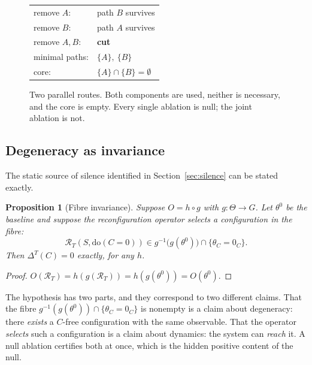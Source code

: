 \documentclass[11pt]{article}
\newtheorem{proposition}[theorem]{Proposition}
\theoremstyle{definition}
\theoremstyle{remark}
\newcommand{\Rop}{\mathcal{R}}
\newcommand{\dox}[1]{\mathrm{do}(#1)}
\begin{document}
\begin{figure}[ht]
\centering
\begin{minipage}{0.44\textwidth}
\centering
{}
\end{minipage}\hfill
\begin{minipage}{0.52\textwidth}
\small
\begin{tabular}{ll}
remove $A$: & path $B$ survives\\
remove $B$: & path $A$ survives\\
remove $A,B$: & \textbf{cut}\\[4pt]
minimal paths: & $\{A\},\ \{B\}$\\
core: & $\{A\}\cap\{B\}=\emptyset$
\end{tabular}
\end{minipage}
\caption{Two parallel routes. Both components are used, neither is necessary, and the core is empty. Every single ablation is null; the joint ablation is not.}
\end{figure}

\subsection{Degeneracy as invariance}

The static source of silence identified in Section~\ref{sec:silence} can be stated exactly.

\begin{proposition}[Fibre invariance]\label{prop:fibre}
Suppose $O=h\circ g$ with $g:\Theta\to G$. Let $\theta^0$ be the baseline and suppose the reconfiguration operator selects a configuration in the fibre:
\[
\Rop_T(S,\dox{C=0})\in g^{-1}\bigl(g(\theta^0)\bigr)\cap\{\theta_C=0_C\}.
\]
Then $\Delta^T(C)=0$ exactly, for any $h$.
\end{proposition}
\begin{proof}
$O(\Rop_T)=h(g(\Rop_T))=h(g(\theta^0))=O(\theta^0)$.
\end{proof}

The hypothesis has two parts, and they correspond to two different claims. That the fibre $g^{-1}(g(\theta^0))\cap\{\theta_C=0_C\}$ is nonempty is a claim about degeneracy: there \emph{exists} a $C$-free configuration with the same observable. That the operator \emph{selects} such a configuration is a claim about dynamics: the system can \emph{reach} it. A null ablation certifies both at once, which is the hidden positive content of the null.
\end{document}
